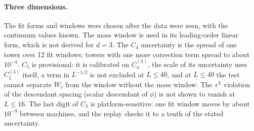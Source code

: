 \paragraph{Three dimensions.}\label{htp:d3:caveats}
The fit forms and windows were chosen after the data were seen, with the continuum values known. The mass window is used
in its leading-order linear form, which is not derived for $d=3$. The $C_4$ uncertainty is the spread of one tower over
12 fit windows; towers with one more correction term spread to about $10^{-4}$. $C_5$ is provisional: it is calibrated on
$C_4^{(3)}$, the scale of its uncertainty uses $C_5^{(3)}$ itself, a term in $L^{-1/2}$ is not excluded at $L\le40$, and
at $L\le40$ the test cannot separate $W_c$ from the window without the mass window. The $\epsilon^3$ violation of the descendant
spacing (scalar descendant of $\phi$) is not shown to vanish at $L\le16$. The last digit of $C_3$ is platform-sensitive: one fit window moves by about
$10^{-9}$ between machines, and the replay checks it to a tenth of the stated uncertainty.
